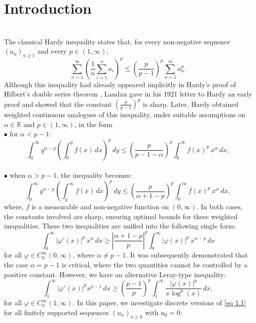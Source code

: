 \documentclass[11pt]{amsart}
\newcommand{\1}{[1]}
\def\phi{\varphi}
\begin{document}
\section{Introduction}
\phantom{.}\\
The classical Hardy inequality states that, for every non-negative sequence
\((a_n)_{n\ge 1}\) and every \(p\in(1,\infty)\),
\[
\sum_{n=1}^{\infty}
\left(
\frac{1}{n}\sum_{i=1}^{n} a_i
\right)^p
\le
\left(\frac{p}{p-1}\right)^p
\sum_{n=1}^{\infty} a_n^p .
\]
Although this inequality had already appeared implicitly in Hardy's proof of
Hilbert's double series theorem \cite{Har20}, Landau gave in his 1921 letter to
Hardy \cite{Lan21} an early proof and showed that the constant
\(\left(\frac{p}{p-1}\right)^p\) is sharp. Later, Hardy obtained weighted
continuous analogues of this inequality, under suitable assumptions on
\(\alpha\in\mathbb{R}\) and \(p\in(1,\infty)\), in the form \\ 
$\bullet$ for $ \alpha < p-1 $:
$$
\int_0^\infty y^{\alpha-p} \left(  \int_0^y f(x) \, dx \right)^p \, dy 
\leq \left(  \frac{p} {p -1 - \alpha} \right)^p \int_0^\infty f(x)^p \ x^{\alpha} \, dx,
$$
\phantom{.} \\
$\bullet$ when $ \alpha > p-1$, the inequality becomes:
$$
\int_0^\infty y^{\alpha-p} \left( \int_y^\infty f(x) \, dx \right)^p \, dy 
\leq \left(  \frac{p} { \alpha+1-p} \right)^p  \int_0^\infty f(x)^p \ x^{\alpha} \, dx,
$$
where, $f$ is a measurable and non-negative function on $(0, \infty).$ In both cases, the constants involved are sharp, ensuring optimal bounds for these weighted inequalities. These two inequalities are unified into the following single form:
\begin{equation}
\int_{0}^\infty |\phi'(x)|^p \, x^{\alpha} \, dx \geq \left|  \frac { \alpha+1-p}{p}\right|^p \int_{0}^\infty |\phi(x)|^p \, x^{\alpha-p} \, dx
\label{eq 1.1} \tag{1.1}
\end{equation}
for all $\phi \in C_0^\infty(0, \infty)$, where $\alpha \neq p-1$. It was subsequently demonstrated that the case $\alpha = p-1$ is critical, where the two quantities cannot be controlled by a positive constant. However, we have an alternative Leray-type inequality:
\begin{equation}
\int_{1}^{\infty} |\phi'(x)|^p x^{p-1}\, dx \geq \left( \frac{p-1}{p} \right)^p \int_{1}^{\infty} \frac{|\phi(x)|^p}{x \log^p(x)} \, dx, \tag{1.2} \label{eq 1.2}
\end{equation}
for all $\phi \in C_0^\infty(1, \infty)$. In this paper, we investigate discrete versions of \eqref{eq 1.1} for all finitely supported sequences $(u_{n})_{n\geq 0}$ with $u_{0} = 0:$
\end{document}
